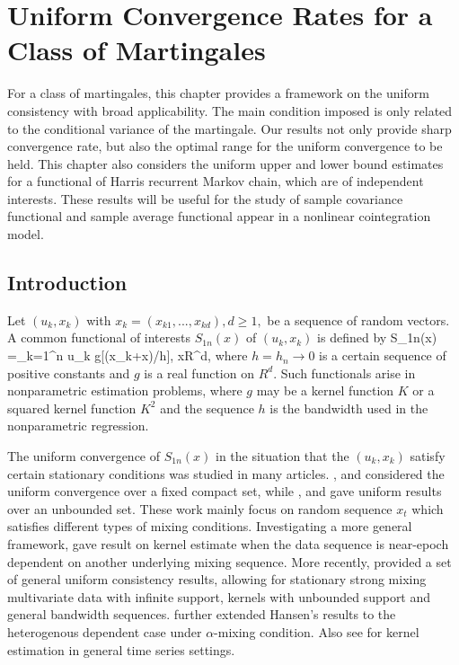 
\chapter{Uniform Convergence Rates for a Class of Martingales} 
\ifpdf
    \graphicspath{{Chapter1/Chapter1Figs/PNG/}{Chapter1/Chapter1Figs/PDF/}{Chapter1/Chapter1Figs/}}
\else
    \graphicspath{{Chapter1/Chapter1Figs/EPS/}{Chapter1/Chapter1Figs/}}
\fi
For a class of martingales, this chapter provides a framework on the uniform consistency with broad applicability. The main condition imposed is only related to the conditional variance of the martingale. Our results not only  provide sharp convergence rate, but also the optimal range for the uniform convergence to be held. This chapter also considers the uniform upper and lower  bound estimates for a functional of Harris recurrent Markov chain, which  are of independent interests. These results will be useful for the study of sample covariance functional and sample average functional appear in a nonlinear cointegration model.

\section{Introduction}
Let $(u_k, x_k)$ with $x_k=(x_{k1},..., x_{kd}), d\ge 1,$ be a sequence of random vectors. A common functional of interests $S_{1n}(x)$ of
$(u_k, x_k)$ is defined by
\be
  S_{1n}(x) =\sum_{k=1}^n u_k g[(x_k+x)/h], \quad x\in R^d,
\ee
where $h=h_n\to 0$ is a certain sequence of positive constants and $g$ is a real function on $R^d$. Such functionals arise in nonparametric estimation problems, where $g$ may be a kernel function $K$ or a squared kernel function $K^{2}$ and the
sequence $h$ is the bandwidth used in the nonparametric regression.


The uniform convergence of $S_{1n}(x)$ in the situation that the $(u_k, x_k)$ satisfy certain stationary conditions was studied in many articles. \cite{liero1989}, \cite{peligrad1992} and \cite{nzedoukhan2004} considered the uniform convergence over a fixed compact set, while \cite{masry1996}, \cite{bosq1998} and \cite{fanyao2003} gave uniform results over an unbounded set. These work mainly focus on random sequence $x_t$ which satisfies different types of mixing conditions. Investigating a more general framework, \cite{andrews1995} gave result on kernel estimate when the data sequence is near-epoch dependent on another underlying mixing sequence. More recently, \cite{hansen2008} provided a set of general uniform consistency results, allowing for stationary strong mixing multivariate data with infinite support, kernels with unbounded support and general bandwidth sequences. \cite{kristensen2009} further extended Hansen's results to the heterogenous dependent case under $\alpha$-mixing condition. Also see \cite{wuhuanghuang2010} for kernel estimation in general time series settings.



